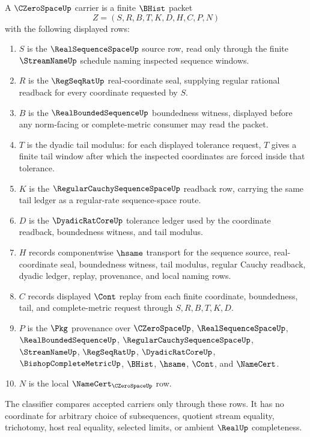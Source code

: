 \begin{definition}
\label{def:c-zero-space-carrier}
A $\CZeroSpaceUp$ carrier is a finite $\BHist$ packet
$$
Z=(S,R,B,T,K,D,H,C,P,N)
$$
with the following displayed rows:
\begin{enumerate}
\item $S$ is the $\RealSequenceSpaceUp$ source row, read only through the finite $\StreamNameUp$ schedule naming inspected sequence windows.
\item $R$ is the $\RegSeqRatUp$ real-coordinate seal, supplying regular rational readback for every coordinate requested by $S$.
\item $B$ is the $\RealBoundedSequenceUp$ boundedness witness, displayed before any norm-facing or complete-metric consumer may read the packet.
\item $T$ is the dyadic tail modulus: for each displayed tolerance request, $T$ gives a finite tail window after which the inspected coordinates are forced inside that tolerance.
\item $K$ is the $\RegularCauchySequenceSpaceUp$ readback row, carrying the same tail ledger as a regular-rate sequence-space route.
\item $D$ is the $\DyadicRatCoreUp$ tolerance ledger used by the coordinate readback, boundedness witness, and tail modulus.
\item $H$ records componentwise $\hsame$ transport for the sequence source, real-coordinate seal, boundedness witness, tail modulus, regular Cauchy readback, dyadic ledger, replay, provenance, and local naming rows.
\item $C$ records displayed $\Cont$ replay from each finite coordinate, boundedness, tail, and complete-metric request through $S,R,B,T,K,D$.
\item $P$ is the $\Pkg$ provenance over $\CZeroSpaceUp$, $\RealSequenceSpaceUp$, $\RealBoundedSequenceUp$, $\RegularCauchySequenceSpaceUp$, $\StreamNameUp$, $\RegSeqRatUp$, $\DyadicRatCoreUp$, $\BishopCompleteMetricUp$, $\BHist$, $\hsame$, $\Cont$, and $\NameCert$.
\item $N$ is the local $\NameCert_{\CZeroSpaceUp}$ row.
\end{enumerate}
The classifier compares accepted carriers only through these rows. It has no coordinate for arbitrary choice of subsequences, quotient stream equality, trichotomy, host real equality, selected limits, or ambient $\RealUp$ completeness.
\end{definition}

